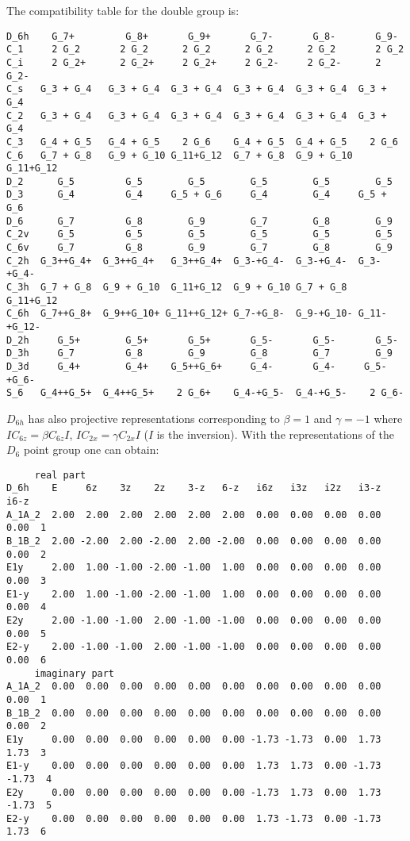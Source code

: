 \documentclass[12pt,a4paper]{article}
\begin{document}
The compatibility table for the double group is:
\begin{footnotesize}
\begin{verbatim}
D_6h    G_7+         G_8+       G_9+       G_7-       G_8-       G_9-
C_1     2 G_2       2 G_2      2 G_2      2 G_2      2 G_2       2 G_2
C_i     2 G_2+      2 G_2+     2 G_2+     2 G_2-     2 G_2-      2 G_2-
C_s   G_3 + G_4   G_3 + G_4  G_3 + G_4  G_3 + G_4  G_3 + G_4  G_3 + G_4
C_2   G_3 + G_4   G_3 + G_4  G_3 + G_4  G_3 + G_4  G_3 + G_4  G_3 + G_4
C_3   G_4 + G_5   G_4 + G_5    2 G_6    G_4 + G_5  G_4 + G_5    2 G_6
C_6   G_7 + G_8   G_9 + G_10 G_11+G_12  G_7 + G_8  G_9 + G_10 G_11+G_12
D_2      G_5         G_5        G_5        G_5        G_5        G_5
D_3      G_4         G_4     G_5 + G_6     G_4        G_4     G_5 + G_6    
D_6      G_7         G_8        G_9        G_7        G_8        G_9
C_2v     G_5         G_5        G_5        G_5        G_5        G_5
C_6v     G_7         G_8        G_9        G_7        G_8        G_9
C_2h  G_3++G_4+  G_3++G_4+   G_3++G_4+  G_3-+G_4-  G_3-+G_4-  G_3-+G_4- 
C_3h  G_7 + G_8  G_9 + G_10  G_11+G_12  G_9 + G_10 G_7 + G_8  G_11+G_12
C_6h  G_7++G_8+  G_9++G_10+ G_11++G_12+ G_7-+G_8-  G_9-+G_10- G_11-+G_12-
D_2h     G_5+        G_5+       G_5+       G_5-       G_5-       G_5-
D_3h     G_7         G_8        G_9        G_8        G_7        G_9
D_3d     G_4+        G_4+    G_5++G_6+     G_4-       G_4-     G_5-+G_6-
S_6   G_4++G_5+  G_4++G_5+    2 G_6+    G_4-+G_5-  G_4-+G_5-    2 G_6-
\end{verbatim}
\end{footnotesize}
$D_{6h}$ has also projective representations corresponding to
$\beta=1$ and $\gamma=-1$ where $IC_{6z} = \beta C_{6z} I$, 
$IC_{2x} = \gamma C_{2x} I$ ($I$ is the inversion). With the 
representations of the $D_6$ point group one can obtain:
\begin{footnotesize}
\begin{verbatim}
     real part
D_6h    E     6z    3z    2z    3-z   6-z   i6z   i3z   i2z   i3-z   i6-z
A_1A_2  2.00  2.00  2.00  2.00  2.00  2.00  0.00  0.00  0.00  0.00   0.00  1
B_1B_2  2.00 -2.00  2.00 -2.00  2.00 -2.00  0.00  0.00  0.00  0.00   0.00  2
E1y     2.00  1.00 -1.00 -2.00 -1.00  1.00  0.00  0.00  0.00  0.00   0.00  3
E1-y    2.00  1.00 -1.00 -2.00 -1.00  1.00  0.00  0.00  0.00  0.00   0.00  4
E2y     2.00 -1.00 -1.00  2.00 -1.00 -1.00  0.00  0.00  0.00  0.00   0.00  5
E2-y    2.00 -1.00 -1.00  2.00 -1.00 -1.00  0.00  0.00  0.00  0.00   0.00  6
     imaginary part
A_1A_2  0.00  0.00  0.00  0.00  0.00  0.00  0.00  0.00  0.00  0.00   0.00  1
B_1B_2  0.00  0.00  0.00  0.00  0.00  0.00  0.00  0.00  0.00  0.00   0.00  2
E1y     0.00  0.00  0.00  0.00  0.00  0.00 -1.73 -1.73  0.00  1.73   1.73  3
E1-y    0.00  0.00  0.00  0.00  0.00  0.00  1.73  1.73  0.00 -1.73  -1.73  4
E2y     0.00  0.00  0.00  0.00  0.00  0.00 -1.73  1.73  0.00  1.73  -1.73  5
E2-y    0.00  0.00  0.00  0.00  0.00  0.00  1.73 -1.73  0.00 -1.73   1.73  6
\end{verbatim}
\end{footnotesize}
\end{document}
